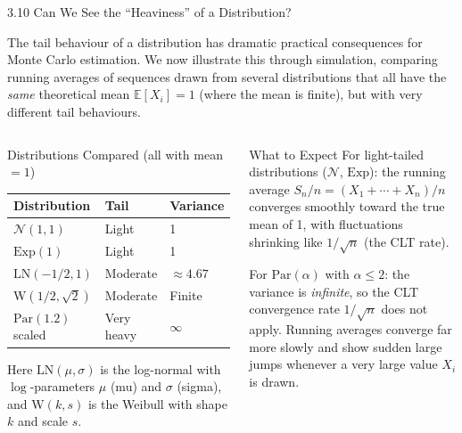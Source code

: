 \documentclass[aspectratio=169,10pt]{beamer}
\newcommand{\EE}{\mathbb{E}}
\newcommand{\NN}{\mathcal{N}}
\begin{document}
\begin{frame}[allowframebreaks]{3.10 Can We See the ``Heaviness'' of a Distribution?}

The tail behaviour of a distribution has dramatic practical consequences for
Monte Carlo estimation.  We now illustrate this through simulation, comparing
running averages of sequences drawn from several distributions that all have
the \emph{same} theoretical mean $\EE[X_i] = 1$ (where the mean is finite),
but with very different tail behaviours.

\begin{columns}
  \begin{block}{Distributions Compared (all with mean $= 1$)}
    \begin{tabular}{@{}lll@{}}
      \toprule
      Distribution & Tail & Variance \\
      \midrule
      $\NN(1,1)$ & Light & 1 \\
      $\mathrm{Exp}(1)$ & Light & 1 \\
      $\mathrm{LN}(-1/2,1)$ & Moderate & $\approx 4.67$ \\
      $\mathrm{W}(1/2,\sqrt{2})$ & Moderate & Finite \\
      $\mathrm{Par}(1.2)$ scaled & Very heavy & $\infty$ \\
      \bottomrule
    \end{tabular}

    Here $\mathrm{LN}(\mu, \sigma)$ is the log-normal with $\log$-parameters $\mu$
    (mu) and $\sigma$ (sigma), and $\mathrm{W}(k, s)$ is the Weibull with shape $k$
    and scale $s$.
  \end{block}

  \begin{alertblock}{What to Expect}
    For light-tailed distributions ($\NN$, $\mathrm{Exp}$): the running average
    $S_n/n = (X_1 + \cdots + X_n)/n$ converges smoothly toward the true mean
    of 1, with fluctuations shrinking like $1/\sqrt{n}$ (the CLT rate).

    \medskip
    For $\mathrm{Par}(\alpha)$ with $\alpha \le 2$: the variance is
    \emph{infinite}, so the CLT convergence rate $1/\sqrt{n}$ does not apply.
    Running averages converge far more slowly and show sudden large jumps
    whenever a very large value $X_i$ is drawn.
  \end{alertblock}
\end{columns}

\framebreak


\end{frame}
\end{document}
